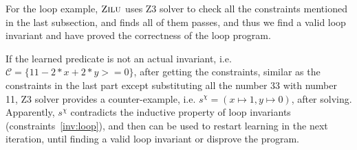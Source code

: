 For the loop example, $\textsc{Zilu}$ uses Z3 solver to check all the constraints mentioned in the last subsection,
and finds all of them passes, and thus we find a valid loop invariant and have proved the correctness of the loop program.

If the learned predicate is not an actual invariant, i.e. $\mathcal{C} = \{11-2*x+2*y>=0\}$,
after getting the constraints, similar as the constraints in the last part except substituting all the number 33 with number 11,
Z3 solver provides a counter-example, i.e. $s^{\chi} = (x \mapsto 1, y \mapsto 0)$, after solving.
Apparently, $s^{\chi}$ contradicts the inductive property of loop invariants (constraints~\ref{inv:loop}),
and then can be used to restart learning in the next iteration, until finding a valid loop invariant or disprove the program.






